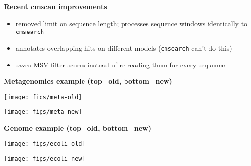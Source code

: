 \documentclass[landscape]{slides}
\begin{document}
\begin{slide}
\begin{center}
\textbf{Recent cmscan improvements}

\small
\begin{itemize}
\item removed limit on sequence length; processes sequence windows identically
to {\tt cmsearch}
\item annotates overlapping hits on different models ({\tt cmsearch} can't do this)
\item saves MSV filter scores instead of re-reading them for every sequence
\end{itemize}

\end{center}
\vfill
\end{slide}
\begin{slide}
\begin{center}
\textbf{Metagenomics example (top=old, bottom=new)}

\texttt{[image: figs/meta-old]}

\vspace{1in}

\texttt{[image: figs/meta-new]}

\end{center}

\vfill
\end{slide}
\begin{slide}
\begin{center}
\textbf{Genome example (top=old, bottom=new)}
\small

\texttt{[image: figs/ecoli-old]}

\texttt{[image: figs/ecoli-new]}
\end{center}

\end{slide}
\end{document}
